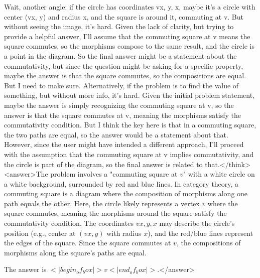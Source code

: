 Wait, another angle: if the circle has coordinates vx, y, x, maybe it's a circle with center (vx, y) and radius x, and the square is around it, commuting at v. But without seeing the image, it's hard. Given the lack of clarity, but trying to provide a helpful answer, I'll assume that the commuting square at v means the square commutes, so the morphisms compose to the same result, and the circle is a point in the diagram. So the final answer might be a statement about the commutativity, but since the question might be asking for a specific property, maybe the answer is that the square commutes, so the compositions are equal. But I need to make sure. Alternatively, if the problem is to find the value of something, but without more info, it's hard. Given the initial problem statement, maybe the answer is simply recognizing the commuting square at v, so the answer is that the square commutes at v, meaning the morphisms satisfy the commutativity condition. But I think the key here is that in a commuting square, the two paths are equal, so the answer would be a statement about that. However, since the user might have intended a different approach, I'll proceed with the assumption that the commuting square at v implies commutativity, and the circle is part of the diagram, so the final answer is related to that.</think><answer>The problem involves a "commuting square at \( v \)" with a white circle on a white background, surrounded by red and blue lines. In category theory, a commuting square is a diagram where the composition of morphisms along one path equals the other. Here, the circle likely represents a vertex \( v \) where the square commutes, meaning the morphisms around the square satisfy the commutativity condition. The coordinates \( vx, y, x \) may describe the circle's position (e.g., center at \( (vx, y) \) with radius \( x \)), and the red/blue lines represent the edges of the square. Since the square commutes at \( v \), the compositions of morphisms along the square's paths are equal.  

The answer is \(<|begin_of_box|>v<|end_of_box|>\).</answer>